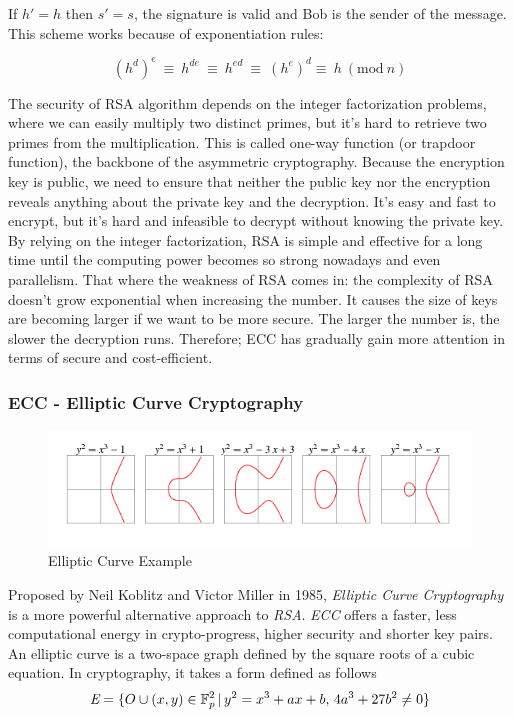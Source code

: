 If $h' = h$ then $s' = s$, the signature is valid and Bob is the sender of the message. This scheme works because of exponentiation rules:

\begin{equation}
  (h^d)^e\ \equiv\ h^{de}\ \equiv\ h^{ed}\ \equiv\ (h^e)^d \equiv\ h \ (\textrm{mod}\ n)
\end{equation}

The security of RSA algorithm depends on the integer factorization problems, where we can easily multiply two distinct primes, but it's hard to retrieve two primes from the multiplication. This is called one-way function (or trapdoor function), the backbone of the asymmetric cryptography. Because the encryption key is public, we need to ensure that neither the public key nor the encryption reveals anything about the private key and the decryption. It's easy and fast to encrypt, but it's hard and infeasible to decrypt without knowing the private key. By relying on the integer factorization, RSA is simple and effective for a long time until the computing power becomes so strong nowadays and even parallelism. That where the weakness of RSA comes in: the complexity of RSA doesn't grow exponential when increasing the number. It causes the size of keys are becoming larger if we want to be more secure. The larger the number is, the slower the decryption runs. Therefore; ECC has gradually gain more attention in terms of secure and cost-efficient.

\subsubsection{ECC - Elliptic Curve Cryptography}
\begin{figure}[ht!]
  \centering
  \includegraphics[width=1\textwidth]{images/example_curve.png}
  \caption[Elliptic Curve Example]{Elliptic Curve Example}
  \label{fig:ec_example}
\end{figure}

Proposed by Neil Koblitz and Victor Miller in 1985, \emph{Elliptic Curve Cryptography} is a more powerful alternative approach to \emph{RSA}. \emph{ECC} offers a faster, less computational energy in crypto-progress, higher security and shorter key pairs.
An elliptic curve is a two-space graph defined by the square roots of a cubic equation. In cryptography, it takes a form defined as follows
\begin{equation}
  \emph{E} = \{{O}\cup{(x,y)\in \mathbb{F}_{p}^2 \,|\, y^2 = x^3 + ax + b, \, 4a^3 + 27b^2 \neq 0}\}
\end{equation}

